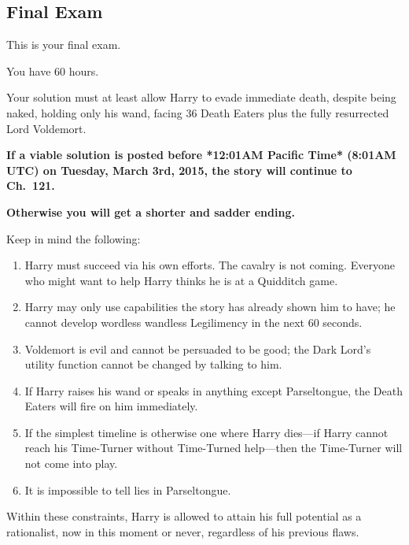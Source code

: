 \subsection{\textbf{Final Exam}}

\noindent
This is your final exam.

\SmallVSpace
\noindent
You have 60 hours.

\SmallVSpace
\noindent
Your solution must at least allow Harry to evade immediate death,
despite being naked, holding only his wand, facing 36 Death Eaters
plus the fully resurrected Lord Voldemort.

\SmallVSpace
\noindent
\textbf{If a viable solution is posted before
*12:01AM Pacific Time* (8:01AM UTC) on Tuesday, March 3rd, 2015,
the story will continue to Ch.~121.}

\SmallVSpace
\noindent
\textbf{Otherwise you will get a shorter and sadder ending.}

\SmallVSpace
\noindent
Keep in mind the following:

\begin{enumerate}
\item Harry must succeed via his own efforts. The cavalry is not coming.
Everyone who might want to help Harry thinks he is at a Quidditch game.

\item Harry may only use capabilities the story has already shown him to
have;
he cannot develop wordless wandless Legilimency in the next 60 seconds.

\item Voldemort is evil and cannot be persuaded to be good;
the Dark Lord's utility function cannot be changed by talking to him.

\item If Harry raises his wand or speaks in anything except Parseltongue,
the Death Eaters will fire on him immediately.

\item If the simplest timeline is otherwise one where Harry dies---if 
Harry cannot reach his Time-Turner without Time-Turned help---then 
the Time-Turner will not come into play.

\item It is impossible to tell lies in Parseltongue.
\end{enumerate}

\SmallVSpace
\noindent
Within these constraints,
Harry is allowed to attain his full potential as a rationalist,
now in this moment or never,
regardless of his previous flaws.

